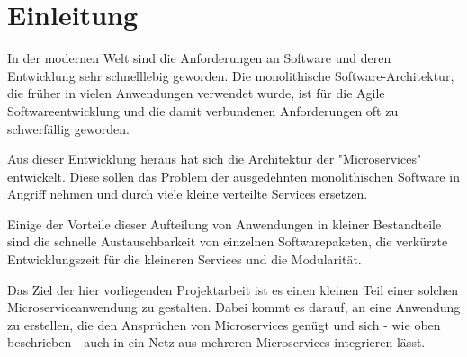 
\chapter{Einleitung}
\label{ch:Einleitung}
In der modernen Welt sind die Anforderungen an Software und deren Entwicklung sehr schnelllebig geworden. Die monolithische Software-Architektur, die früher in vielen Anwendungen verwendet wurde, ist für die Agile Softwareentwicklung und die damit verbundenen Anforderungen oft zu schwerfällig geworden.

Aus dieser Entwicklung heraus hat sich die Architektur der "Microservices" entwickelt. Diese sollen das Problem der ausgedehnten monolithischen Software in Angriff nehmen und durch viele kleine  verteilte Services ersetzen.

Einige der Vorteile dieser Aufteilung von Anwendungen in kleiner Bestandteile sind die schnelle Austauschbarkeit von einzelnen Softwarepaketen, die verkürzte Entwicklungszeit für die kleineren Services und die Modularität.

Das Ziel der hier vorliegenden Projektarbeit ist es einen kleinen Teil einer solchen Microserviceanwendung zu gestalten. Dabei kommt es darauf, an eine Anwendung zu erstellen, die den Ansprüchen von Microservices genügt und sich - wie oben beschrieben - auch in ein Netz aus mehreren Microservices integrieren lässt.